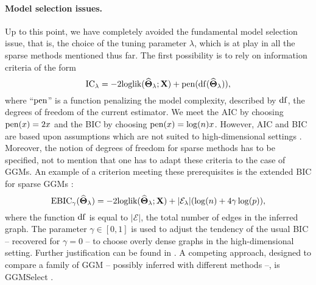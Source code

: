 
\paragraph*{Model  selection  issues.}   Up  to this  point,  we  have
completely avoided the fundamental model selection issue, that is, the
choice of the tuning parameter $\lambda$,  which is at play in all the
sparse methods mentioned  thus far.  The first possibility  is to rely
on information criteria of the form
\begin{equation*}
  \textrm{IC}_\lambda = - 2 \textrm{loglik}(\widehat{\boldsymbol\Theta}_\lambda;\mathbf{X}) + \mathrm{pen}(\mathrm{df}(\widehat{\boldsymbol\Theta}_\lambda)),
\end{equation*}
where ``$\mathrm{pen}$'' is a function penalizing the model complexity,
described by $\mathrm{df}$, the degrees of freedom of the current estimator.
We meet the AIC by choosing $\mathrm{pen}(x) = 2 x $ and the BIC by choosing
$\mathrm{pen}(x) = \log(n) x$.  However, AIC and BIC are based upon
assumptions which are not suited to high-dimensional settings
\citep[see][]{2012_SS_Giraud}.  Moreover, the notion of degrees of
freedom for sparse methods has to be specified, not to mention that
one has to adapt these criteria to the case of GGMs.  An example of a
criterion meeting these prerequisites is the extended BIC for sparse
GGMs \citep{foygel2010extended}:
\begin{equation}
  \label{eq:EBIC_ggm}
  \text{EBIC}_\gamma(\widehat{\invcov}_\lambda)  =   -2 \textrm{loglik}
  (\widehat{\invcov}_\lambda;\bX) + |\mathcal{E}_\lambda| (\log(n) + 4 \gamma \log(p) ),
\end{equation}
where the function $\mathrm{df}$ is equal to $|\mathcal{E}|$, the total number
of edges  in the  inferred graph. The  parameter $\gamma\in  [0,1]$ is
used  to  adjust the  tendency  of  the  usual  BIC --  recovered  for
$\gamma=0$ --  to choose overly  dense graphs in  the high-dimensional
setting.      Further     justification     can    be     found     in
\cite{foygel2010extended}. A competing approach, designed to compare a
family  of GGM  -- possibly  inferred  with different  methods --,  is
GGMSelect \citep{2012_SAGMB_Giraud,giraud2008estimation}.

